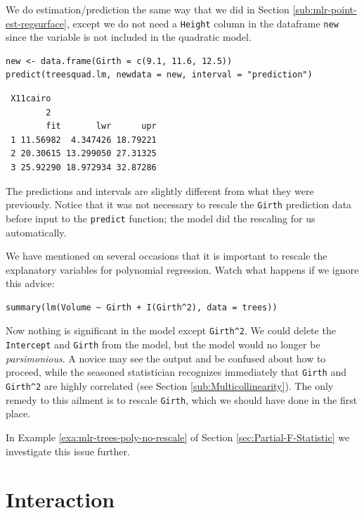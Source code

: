 \documentclass[captions=tableheading]{scrbook}
\begin{document}
We do estimation/prediction the same way that we did in Section \ref{sub:mlr-point-est-regsurface}, except we do not need a \texttt{Height} column in the dataframe \texttt{new} since the variable is not included in the quadratic model.


\begin{verbatim}
new <- data.frame(Girth = c(9.1, 11.6, 12.5))
predict(treesquad.lm, newdata = new, interval = "prediction")
\end{verbatim}

\begin{verbatim}
 X11cairo 
        2
        fit       lwr      upr
 1 11.56982  4.347426 18.79221
 2 20.30615 13.299050 27.31325
 3 25.92290 18.972934 32.87286
\end{verbatim}

The predictions and intervals are slightly different from what they were previously. Notice that it was not necessary to rescale the \texttt{Girth} prediction data before input to the \texttt{predict} function; the model did the rescaling for us automatically.

\begin{rem}
We have mentioned on several occasions that it is important to rescale the explanatory variables for polynomial regression. Watch what happens if we ignore this advice:


\begin{verbatim}
summary(lm(Volume ~ Girth + I(Girth^2), data = trees))
\end{verbatim}

Now nothing is significant in the model except \texttt{Girth\textasciicircum{}2}. We could delete the \texttt{Intercept} and \texttt{Girth} from the model, but the model would no longer be \emph{parsimonious}. A novice may see the output and be confused about how to proceed, while the seasoned statistician recognizes immediately that \texttt{Girth} and \texttt{Girth\textasciicircum{}2} are highly correlated (see Section \ref{sub:Multicollinearity}). The only remedy to this ailment is to rescale \texttt{Girth}, which we should have done in the first place.

In Example \ref{exa:mlr-trees-poly-no-rescale} of Section \ref{sec:Partial-F-Statistic} we investigate this issue further.

\end{rem}
\section{Interaction}
\label{sec-12-5}
\end{document}
